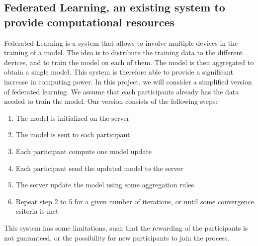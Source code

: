 \documentclass{article}
\begin{document}
\subsection{Federated Learning, an existing system to provide computational resources}
Federated Learning is a system that allows to involve multiple devices in the training of a model. The idea is to
distribute the training data to the different devices, and to train the model on each of them. The model is then
aggregated to obtain a single model. This system is therefore able to provide a significant increase in computing power.
In this project, we will consider a simplified version of federated learning. We assume that each participants
already has the data needed to train the model. Our version consists of the following steps:
\begin{enumerate}
    \item The model is initialized on the server
    \item The model is sent to each participant
    \item Each participant compute one model update
    \item Each participant send the updated model to the server
    \item The server update the model using some aggregation rules
    \item Repeat step 2 to 5 for a given number of iterations, or until some convergence criteria is met
\end{enumerate}
This system has some limitations, such that the rewarding of the participants is not guaranteed, or the possibility for
new participants to join the process.
\end{document}
